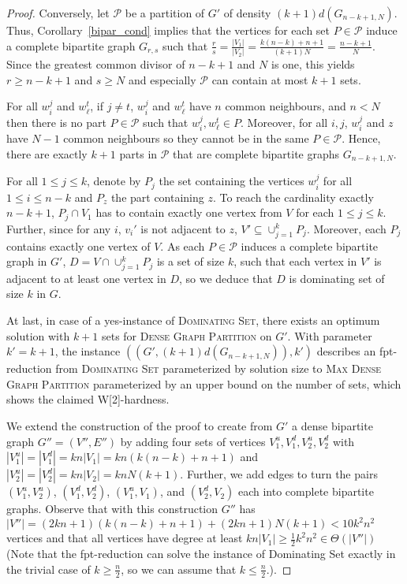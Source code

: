 \documentclass[a4paper,USenglish,cleveref, autoref]{lipics-v2021}
\newcommand\DGP{\textsc{Dense Graph Partition}}
\begin{document}
\begin{proof}
Conversely, let $\mathcal{P}$ be a partition of $G'$ of density $(k+1)d(G_{n-k+1,N})$.
Thus, Corollary~\ref{bipar_cond} implies that the vertices for each set $P\in \mathcal{P}$ induce a complete bipartite graph $G_{r,s}$ such that $\frac rs=\frac{|V_1|}{|V_2|}=\frac{k(n-k)+n+1}{(k+1)N}=\frac{n-k+1}{N}$. Since the greatest common divisor of $n-k+1$ and $N$ is one, this yields $r\geq n-k+1$ and $s\geq N$ and especially $\mathcal{P}$ can contain at most $k+1$ sets. 

For all $w_i^j$ and $w_{\ell}^{t}$, if $j \neq t$, $w_i^j$ and $w_{\ell}^{t}$ have $n$ common neighbours, and $n < N$ then there is no part $P\in \mathcal{P}$ such that $w_i^j, w_{\ell}^{t} \in P$. Moreover, for all $i,j$, $w_i^j$ and $z$ have $N-1$ common neighbours so they cannot be in the same $P\in \mathcal{P}$. Hence, there are exactly $k+1$ parts in $\mathcal{P}$ that are complete bipartite graphs $G_{n-k+1,N}$.


For all $1 \leq j \leq k$,  denote by $P_j$ the set containing the vertices $w^j_i$ for all $1 \leq i \leq n-k$ and $P_z$ the part containing $z$. To reach the cardinality exactly $n-k+1$, $P_j\cap V_1$ has to contain exactly one vertex from $V$ for each $1\leq j\leq k$.
Further, since for any $i$, $v_i'$ is not adjacent to $z$, $V' \subseteq \cup_{j=1}^k P_j$. Moreover, each $P_j$ contains exactly one vertex of $V$.
As each $P \in \mathcal{P}$ induces a complete bipartite graph in $G'$, $D= V \cap  \cup_{j=1}^k P_j$ is a set of size $k$, such that each vertex in $V'$ is adjacent to at least one vertex in $D$, so we deduce that $D$ is dominating set of size $k$ in $G$. 

At last, in case of a yes-instance of \textsc{Dominating Set}, there exists an optimum solution with $k+1$ sets for \textsc{Dense Graph Partition} on $G'$. With parameter $k'=k+1$, the instance $((G',(k+1)d(G_{n-k+1,N})),k')$ describes an fpt-reduction from \textsc{Dominating Set} parameterized by solution size to  \textsc{Max Dense Graph Partition} parameterized by an upper bound on the number of sets, which shows the claimed W[2]-hardness.

 
\medskip
We extend the construction of the proof to create from $G'$ a dense bipartite graph $G''=(V'',E'')$ by adding four sets of vertices $V_1^u, V_1^d, V_2^u, V_2^d$ with $|V_1^u|=|V_1^d|=kn|V_1|=kn(k(n-k)+n+1)$  and $|V_2^u|=|V_2^d|=kn|V_2|=knN(k+1)$. Further, we add edges to turn the pairs $(V_1^u, V_2^u)$, $(V_1^d, V_2^d)$, $(V_1^u, V_1)$, and $(V_2^d,V_2)$ each into complete bipartite graphs. Observe that with this construction $G''$ has $|V''|=(2kn+1)(k(n-k)+n+1)+(2kn+1)N(k+1)< 10k^2n^2$  vertices and that all vertices have degree at least $kn|V_1|\geq \frac 12 k^2 n^2\in \Theta(|V''|)$ (Note that the fpt-reduction can solve the instance of {\sc Dominating Set} exactly in the trivial case of $k\geq \frac n2$, so we can assume that $k\leq \frac n2$.).


\end{proof}
\end{document}
